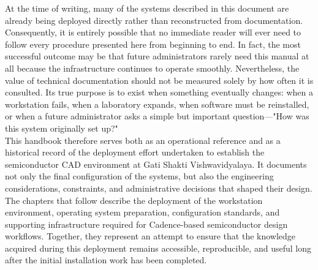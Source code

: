 At the time of writing, many of the systems described in this document are already being deployed directly rather than reconstructed from documentation. Consequently, it is entirely possible that no immediate reader will ever need to follow every procedure presented here from beginning to end. In fact, the most successful outcome may be that future administrators rarely need this manual at all because the infrastructure continues to operate smoothly. Nevertheless, the value of technical documentation should not be measured solely by how often it is consulted. Its true purpose is to exist when something eventually changes: when a workstation fails, when a laboratory expands, when software must be reinstalled, or when a future administrator asks a simple but important question—"How was this system originally set up?"\\ 

This handbook therefore serves both as an operational reference and as a historical record of the deployment effort undertaken to establish the semiconductor CAD environment at Gati Shakti Vishwavidyalaya. It documents not only the final configuration of the systems, but also the engineering considerations, constraints, and administrative decisions that shaped their design.\\

The chapters that follow describe the deployment of the workstation environment, operating system preparation, configuration standards, and supporting infrastructure required for Cadence-based semiconductor design workflows. Together, they represent an attempt to ensure that the knowledge acquired during this deployment remains accessible, reproducible, and useful long after the initial installation work has been completed.\\ 
